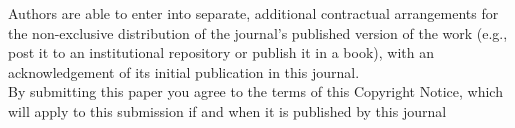 \documentclass{jors}
\begin{document}
Authors are able to enter into separate, additional contractual arrangements for the non-exclusive distribution of the journal's published version of the work (e.g., post it to an institutional repository or publish it in a book), with an acknowledgement of its initial publication in this journal. \\

By submitting this paper you agree to the terms of this Copyright Notice, which will apply to this submission if and when it is published by this journal
\end{document}
